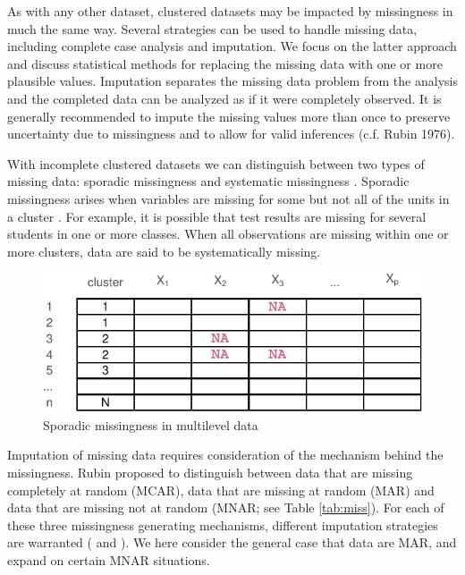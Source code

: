 \documentclass[
]{jss}
\begin{document}
As with any other dataset, clustered datasets may be impacted by
missingness in much the same way. Several strategies can be used to
handle missing data, including complete case analysis and imputation. We
focus on the latter approach and discuss statistical methods for
replacing the missing data with one or more plausible values. Imputation
separates the missing data problem from the analysis and the completed
data can be analyzed as if it were completely observed. It is generally
recommended to impute the missing values more than once to preserve
uncertainty due to missingness and to allow for valid inferences (c.f.
Rubin 1976).

With incomplete clustered datasets we can distinguish between two types
of missing data: sporadic missingness and systematic missingness
\citep{resc13}. Sporadic missingness arises when variables are missing
for some but not all of the units in a cluster \citep{buur18, jola18}.
For example, it is possible that test results are missing for several
students in one or more classes. When all observations are missing
within one or more clusters, data are said to be systematically missing.

\begin{CodeChunk}
\begin{figure}

{\centering \includegraphics{Imputation_of_Incomplete_Multilevel_Data_files/figure-latex/patterns-1} 

}

\caption[Sporadic missingness in multilevel data]{Sporadic missingness in multilevel data}\label{fig:patterns}
\end{figure}
\end{CodeChunk}

Imputation of missing data requires consideration of the mechanism
behind the missingness. Rubin proposed to distinguish between data that
are missing completely at random (MCAR), data that are missing at random
(MAR) and data that are missing not at random (MNAR; see Table
\ref{tab:miss}). For each of these three missingness generating
mechanisms, different imputation strategies are warranted
(\citet{yuce08} and \citet{hox15}). We here consider the general case
that data are MAR, and expand on certain MNAR situations.
\end{document}
